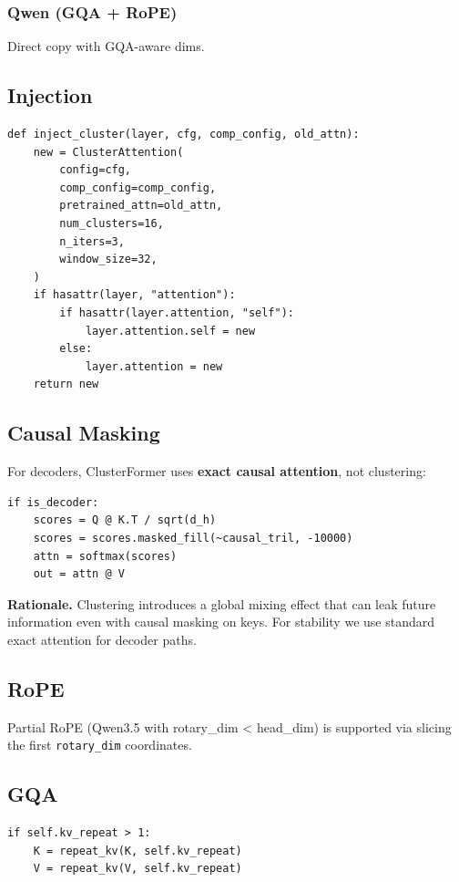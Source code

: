 \subsubsection{Qwen (GQA + RoPE)}
Direct copy with GQA-aware dims.

\subsection{Injection}

\begin{lstlisting}
def inject_cluster(layer, cfg, comp_config, old_attn):
    new = ClusterAttention(
        config=cfg,
        comp_config=comp_config,
        pretrained_attn=old_attn,
        num_clusters=16,
        n_iters=3,
        window_size=32,
    )
    if hasattr(layer, "attention"):
        if hasattr(layer.attention, "self"):
            layer.attention.self = new
        else:
            layer.attention = new
    return new
\end{lstlisting}

\subsection{Causal Masking}

For decoders, ClusterFormer uses \textbf{exact causal attention}, not clustering:

\begin{lstlisting}
if is_decoder:
    scores = Q @ K.T / sqrt(d_h)
    scores = scores.masked_fill(~causal_tril, -10000)
    attn = softmax(scores)
    out = attn @ V
\end{lstlisting}

\textbf{Rationale.} Clustering introduces a global mixing effect that can leak 
future information even with causal masking on keys. For stability we 
use standard exact attention for decoder paths.

\subsection{RoPE}

Partial RoPE (Qwen3.5 with rotary\_dim < head\_dim) is supported via slicing 
the first \texttt{rotary\_dim} coordinates.

\subsection{GQA}

\begin{lstlisting}
if self.kv_repeat > 1:
    K = repeat_kv(K, self.kv_repeat)
    V = repeat_kv(V, self.kv_repeat)
\end{lstlisting}

